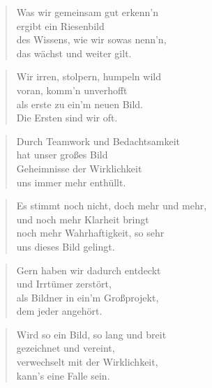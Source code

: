 \documentclass[10pt,a4paper]{article}
\begin{document}
\begin{paracol}{2}
\begin{verse}
Was wir gemeinsam gut erkenn’n \\
ergibt ein Riesenbild \\
des Wissens, wie wir sowas nenn’n, \\
das wächst und weiter gilt. \\
\end{verse}

\begin{verse}
Wir irren, stolpern, humpeln wild \\
voran, komm’n unverhofft \\
als erste zu ein’m neuen Bild. \\
Die Ersten sind wir oft. \\
\end{verse}

\begin{verse}
Durch Teamwork und Bedachtsamkeit \\
hat unser großes Bild \\
Geheimnisse der Wirklichkeit \\
uns immer mehr enthüllt. \\
\end{verse}

\begin{verse}
Es stimmt noch nicht, doch mehr und mehr, \\
und noch mehr Klarheit bringt \\
noch mehr Wahrhaftigkeit, so sehr \\
uns dieses Bild gelingt. \\
\end{verse}

\begin{verse}
Gern haben wir dadurch entdeckt \\
und Irrtümer zerstört, \\
als Bildner in ein’m Großprojekt, \\
dem jeder angehört. \\
\end{verse}

\begin{verse}
Wird so ein Bild, so lang und breit \\
gezeichnet und vereint, \\
verwechselt mit der Wirklichkeit, \\
kann’s eine Falle sein. \\
\end{verse}


\end{paracol}
\end{document}
